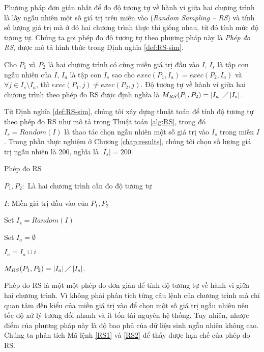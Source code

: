 Phương pháp đơn giản nhất để đo độ tương tự về hành vi giữa hai chương
trình là lấy ngẫu nhiên một số giá trị trên miền vào (\emph{Random
  Sampling -- RS}) và tính số lượng giá trị mà ở đó hai chương trình
thực thi giống nhau, từ đó tính mức độ tương tự. Chúng ta gọi phép đo
độ tương tự theo phương pháp này là \emph{Phép đo RS}, được mô tả hình thức
trong Định nghĩa \ref{def:RS-sim}.

\begin{definition}[Phép đo RS]
  \label{def:RS-sim}
  Cho $P_{1}$ và $P_{2}$ là hai chương trình có cùng miền giá trị đầu
  vào $I$, $I_{s}$ là tập con ngẫu nhiên của $I$, $I_{a}$ là tập con
  $I_{s}$ sao cho $exec(P_{1}, I_a) = exec(P_{2}, I_a)$ và
  $\forall j \in I_{s} \setminus I_{a}$, thì
  $exec(P_{1}, j) \neq exec(P_{2}, j)$. Độ tương tự về hành vi giữa
  hai chương trình theo phép đo RS được định nghĩa là
  $M_{RS}(P_{1}, P_{2}) = \left|I_{a}\right| \diagup
  \left|I_{s}\right| $.
\end{definition}

Từ Định nghĩa \ref{def:RS-sim}, chúng tôi xây dựng thuật toán để tính
độ tương tự theo phép đo RS như mô tả trong Thuật toán \ref{alg:RS},
trong đó $I_s = Random(I)$ là thao tác chọn ngẫu nhiên một số giá trị
vào $I_s$ trong miền $I$. Trong phần thực nghiệm ở Chương
\ref{chap:results}, chúng tôi chọn số lượng giá trị ngẫu nhiên là
$200$, nghĩa là $|I_s| = 200$.

\begin{algorithm}[H]
  \caption{Phép đo RS}
  \label{alg:RS}
  \begin{algorithmic}
  \item $P_{1}, P_{2}:$ Là hai chương trình cần đo độ tương tự
  \item $I$: Miền giá trị đầu vào của $P_{1}, P_{2}$
  \item Set $I_{s} = Random(I)$ 
  \item Set $I_{a} = \emptyset$

         \State
        $I_{a} = I_{a} \cup i$
    \EndIf
    \EndFor
  \item
    $M_{RS}(P_{1}, P_{2}) = \left|I_{a}\right| \diagup
    \left|I_{s}\right| $.
  \end{algorithmic}
\end{algorithm}


Phép đo RS là một một phép đo đơn giản để tính độ tương tự về hành vi giữa hai chương trình. Vì không phải phân tích từng câu lệnh của chương trình mà chỉ quan tâm đến kiểu của miền giá trị vào để chọn một số giá trị ngẫu nhiên nên tốc độ xử lý tương đối nhanh và ít tốn tài nguyên hệ thống. Tuy nhiên, nhược điểm của phương pháp này là độ bao phủ của dữ liệu sinh ngẫu nhiên không cao. Chúng ta phân tích Mã lệnh \ref{RS1} và \ref{RS2} để thấy được hạn chế của phép đo RS.

